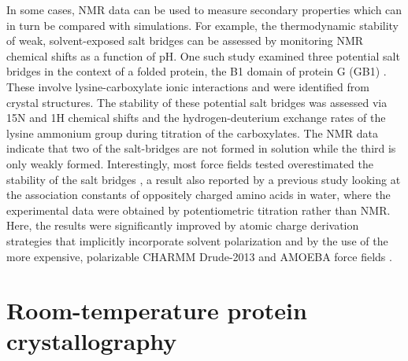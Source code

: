 \documentclass[9pt,review]{livecoms}
\begin{document}
In some cases, NMR data can be used to measure secondary properties which can in turn be compared with simulations.
For example, the thermodynamic stability of weak, solvent-exposed salt bridges can be assessed by monitoring NMR chemical shifts as a function of pH.
One such study examined three potential salt bridges in the context of a folded protein, the B1 domain of protein G (GB1) \cite{ahmed_how_2018}.
These involve lysine-carboxylate ionic interactions and were identified from crystal structures.
The stability of these potential salt bridges was assessed via 15N and 1H chemical shifts and the hydrogen-deuterium exchange rates of the lysine ammonium group during titration of the carboxylates.
The NMR data indicate that two of the salt-bridges are not formed in solution while the third is only weakly formed.
Interestingly, most force fields tested overestimated the stability of the salt bridges \cite{ahmed_how_2018}, a result also reported by a previous study \cite{debiec_evaluating_2014} looking at the association constants of oppositely charged amino acids in water, where the experimental data were obtained by potentiometric titration rather than NMR.
Here, the results were significantly improved by atomic charge derivation strategies that implicitly incorporate solvent polarization \cite{debiec_further_2016} and by the use of the more expensive, polarizable CHARMM Drude-2013 \cite{lopes_polarizable_2013} and AMOEBA force fields \cite{shi_polarizable_2013}.

\section{Room-temperature protein crystallography}
\label{sec:xtal}
\end{document}
